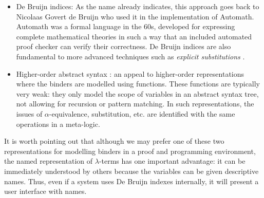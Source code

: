 \begin{itemize}
\item De Bruijn indices: As the name already indicates, this approach
  goes back to Nicolaas Govert de Bruijn who used it in the
  implementation of Automath. Automath was a formal language in the
  60s, developed for expressing complete mathematical theories in such a way
  that an included automated proof checker can verify their
  correctness. De Bruijn indices are also fundamental to more advanced
  techniques such as \emph{explicit substitutions}
  \citep{Abadi:POPL90}.

\item Higher-order abstract syntax
  \citep{Pfenning88pldi}: an appeal to
  higher-order representations where the binders are modelled using
  functions. These functions are typically very weak: they only model the
  scope of variables in an abstract syntax tree, not allowing for recursion or pattern
  matching. In such representations, the issues of
  $\alpha$-equivalence, substitution, etc. are identified with the
  same operations in a meta-logic.
\end{itemize}

It is worth pointing out that although we may prefer one of these two
representations for modelling binders in a proof and programming environment, the named
representation of $\lambda$-terms has one important advantage: it can be
immediately understood by others because the variables can be
given descriptive names. Thus, even if a system uses De Bruijn indexes
internally, it will present a user interface with names.





